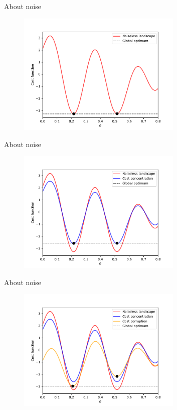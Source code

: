 \documentclass[8pt, xcolor={svgnames}, hyperref={linkcolor=black}, aspectratio=169]{beamer}
\begin{document}
\begin{frame}{About noise}
\begin{figure}
\includegraphics[width=0.7\textwidth]{figures/norm.pdf}
\end{figure}
\end{frame}

\begin{frame}{About noise}
\begin{figure}
\includegraphics[width=0.7\textwidth]{figures/conc.pdf}
\end{figure}
\end{frame}

\begin{frame}{About noise}
\begin{figure}
\includegraphics[width=0.7\textwidth]{figures/corr.pdf}
\end{figure}
\end{frame}
\end{document}
